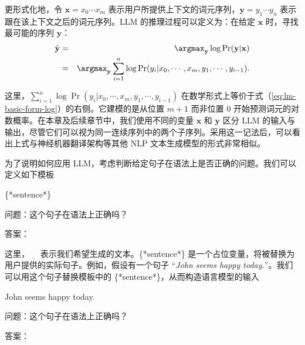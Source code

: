 更形式化地，令 $\mathbf{x} = x_0 \cdots x_m$ 表示用户所提供上下文的词元序列，$\mathbf{y} = y_1 \cdots y_n$ 表示跟在该上下文之后的词元序列。LLM 的推理过程可以定义为：在给定 $\mathbf{x}$ 时，寻找最可能的序列 $\mathbf{y}$：
\begin{eqnarray}
\hat{\mathbf{y}} & = & \argmax_{\mathbf{y}} \log \Pr(\mathbf{y} | \mathbf{x}) \nonumber \\
                 & = & \argmax_{\mathbf{y}} \sum_{i=1}^{n} \log \Pr(y_i|x_0,\cdots,x_m,y_1,\cdots,y_{i-1}).
\end{eqnarray}

\noindent 这里，$\sum_{i=1}^{n} \log \Pr(y_i|x_0,\cdots,x_m,y_1,\cdots,y_{i-1})$ 在数学形式上等价于式（\ref{eq:lm-basic-form-log}）的右侧。它建模的是从位置 $m+1$ 而非位置 $0$ 开始预测词元的对数概率。在本章及后续章节中，我们使用不同的变量 $\mathbf{x}$ 和 $\mathbf{y}$ 区分 LLM 的输入与输出，尽管它们可以视为同一连续序列中的两个子序列。采用这一记法后，可以看出上式与神经机器翻译架构等其他 NLP 文本生成模型的形式非常相似。

为了说明如何应用 LLM，考虑判断给定句子在语法上是否正确的问题。我们可以定义如下模板
\vspace{0.5em}
\begin{tcolorbox}
\hspace{4em} \{*sentence*\}

\hspace{4em} 问题：这个句子在语法上正确吗？

\hspace{4em} 答案：\underline{\hspace{2em}}
\end{tcolorbox}
\vspace{0.5em}

\noindent 这里，$\underline{\hspace{1em}}$ 表示我们希望生成的文本。\{*sentence*\} 是一个占位变量，将被替换为用户提供的实际句子。例如，假设有一个句子 ``\textit{John seems happy today.}''。我们可以用这个句子替换模板中的 \{*sentence*\}，从而构造语言模型的输入

\vspace{0.5em}
\begin{tcolorbox}
\hspace{4em} John seems happy today.

\hspace{4em} 问题：这个句子在语法上正确吗？

\hspace{4em} 答案：\underline{\hspace{2em}}
\end{tcolorbox}
\vspace{0.5em}


